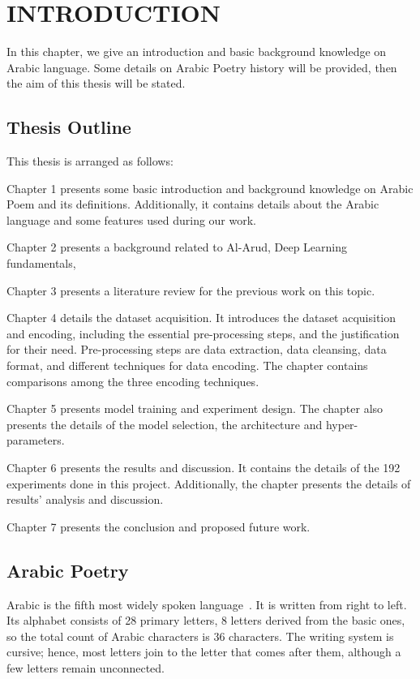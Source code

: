 \chapter{\uppercase{Introduction}}\label{Ch:Intro}
In this chapter, we give an introduction and basic background knowledge on Arabic language. Some details on Arabic Poetry history will be provided, then the aim of this thesis will be stated.

\section{Thesis Outline}
This thesis is arranged as follows:
\begin{enumerate}
	\item Chapter 1 presents some basic introduction and background knowledge on Arabic Poem and its definitions. Additionally, it contains details about the Arabic language and some features used during our work.
	\item Chapter 2 presents a background related to Al-Arud, Deep Learning fundamentals,
	\item Chapter 3 presents a literature review for the previous work on this topic.
	{\color{red}
	\item Chapter 4 details the dataset acquisition. It introduces the
	dataset acquisition and encoding, including the essential pre-processing steps, and the
	justification for their need. Pre-processing steps are data extraction, data cleansing, data
	format, and different techniques for data encoding. The chapter contains comparisons among the
	three encoding techniques. 
	\item Chapter 5 presents model training and experiment design. The chapter also presents the details of the model selection, the architecture and hyper-parameters.
	\item Chapter 6 presents the results and discussion. It contains the details of the 192 experiments done in this project. Additionally, the chapter presents the details of results’ analysis and discussion.
	\item Chapter 7 presents the conclusion and proposed future work.
}
\end{enumerate}



\section{Arabic Poetry } %
Arabic is the fifth most widely spoken language~\cite{Ethnologue_2017}. It is written from right to left. Its alphabet consists of 28 primary letters, 8 letters derived from the basic ones, so the total count of Arabic characters is 36 characters. The writing system is cursive; hence, most letters join to the letter that comes after them, although a few letters remain unconnected.

